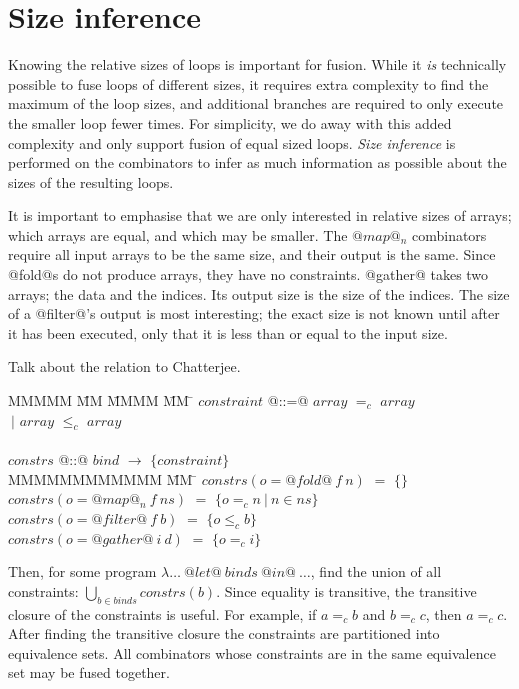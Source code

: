 \section{Size inference}
Knowing the relative sizes of loops is important for fusion.
While it \emph{is} technically possible to fuse loops of different sizes, it requires extra complexity to find the maximum of the loop sizes, and additional branches are required to only execute the smaller loop fewer times.
For simplicity, we do away with this added complexity and only support fusion of equal sized loops.
\emph{Size inference} is performed on the combinators to infer as much information as possible about the sizes of the resulting loops.

It is important to emphasise that we are only interested in relative sizes of arrays; which arrays are equal, and which may be smaller.
The $@map@_n$ combinators require all input arrays to be the same size, and their output is the same.
Since @fold@s do not produce arrays, they have no constraints.
@gather@ takes two arrays; the data and the indices. Its output size is the size of the indices.
The size of a @filter@'s output is most interesting; the exact size is not known until after it has been executed, only that it is less than or equal to the input size.

Talk about the relation to Chatterjee\cite{chatterjee1991size}.

\begin{tabbing}
MMMMM       \= MM \= MMMM \= MM \= \kill
$constraint$\> @::=@ \> $array$  \> $=_c$ \> $array$ \\
            \> $~|$  \> $array$  \> $\le_c$ \> $array$ \\
\\
$constrs$  \> @::@  \> $bind$  \> $\to$ \> $\{constraint\}$ \\
MMMMMMMMMMMM                 \= MM  \= \kill
$constrs(o = @fold@~f~n)  $ \> $=$ \> $\{\}$     \\
$constrs(o = @map@_n~f~ns)$ \> $=$ \> $\{o =_c n~|~n \in ns\}$     \\
$constrs(o = @filter@~f~b)$ \> $=$ \> $\{o \le_c b\}$              \\
$constrs(o = @gather@~i~d)$ \> $=$ \> $\{o =_c i\}$ \\
\end{tabbing}

Then, for some program $\lambda\ldots~@let@~binds~@in@~\ldots$, find the union of all constraints:
$\bigcup_{b \in binds} constrs(b)$.
Since equality is transitive, the transitive closure of the constraints is useful.
For example, if $a =_c b$ and $b =_c c$, then $a =_c c$. 
After finding the transitive closure the constraints are partitioned into equivalence sets.
All combinators whose constraints are in the same equivalence set may be fused together.

